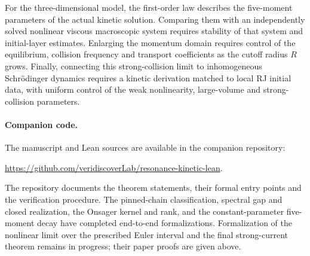 For the three-dimensional model, the first-order law describes the
five-moment parameters of the actual kinetic solution. Comparing them
with an independently solved nonlinear viscous macroscopic system
requires stability of that system and initial-layer estimates.
Enlarging the momentum domain requires control of the equilibrium,
collision frequency and transport coefficients as the cutoff radius
$R$ grows. Finally, connecting this strong-collision limit to
inhomogeneous Schr\"odinger dynamics requires a kinetic derivation
matched to local RJ initial data, with uniform control of the weak
nonlinearity, large-volume and strong-collision parameters.

\paragraph{Companion code.}
The manuscript and Lean sources are available in the companion repository:
\begin{center}
\url{https://github.com/veridiscoverLab/resonance-kinetic-lean}.
\end{center}
The repository documents the theorem statements, their formal entry
points and the verification procedure. The pinned-chain classification,
spectral gap and closed realization, the Onsager kernel and rank, and
the constant-parameter five-moment decay have completed end-to-end
formalizations. Formalization of the nonlinear limit over the prescribed
Euler interval and the final strong-current theorem remains in progress;
their paper proofs are given above.
